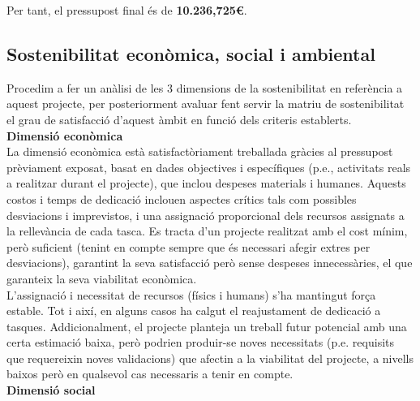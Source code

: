 Per tant, el pressupost final és de \textbf{10.236,725\euro}.

\subsection{Sostenibilitat econòmica, social i ambiental}

Procedim a fer un anàlisi de les 3 dimensions de la sostenibilitat en referència a aquest projecte, per posteriorment avaluar fent servir la matriu de sostenibilitat el grau de satisfacció d’aquest àmbit en funció dels criteris establerts.\\

\noindent \textbf{\large Dimensió econòmica}\\

\noindent La dimensió econòmica està satisfactòriament treballada gràcies al pressupost prèviament exposat, basat en dades objectives i específiques (p.e., activitats reals a realitzar durant el projecte), que inclou despeses materials i humanes. Aquests costos i temps de dedicació inclouen aspectes crítics tals com possibles desviacions i imprevistos, i una assignació proporcional dels recursos assignats a la rellevància de cada tasca. Es tracta d’un projecte realitzat amb el cost mínim, però suficient (tenint en compte sempre que és necessari afegir extres per desviacions), garantint la seva satisfacció però sense despeses innecessàries, el que garanteix la seva viabilitat econòmica.\\

L'assignació i necessitat de recursos (físics i humans) s'ha mantingut força estable. Tot i així, en alguns casos ha calgut el reajustament de dedicació a tasques. Addicionalment, el projecte planteja un treball futur potencial amb una certa estimació baixa, però podrien produir-se noves necessitats (p.e. requisits que requereixin noves validacions) que afectin a la viabilitat del projecte, a nivells baixos però en qualsevol cas necessaris a tenir en compte.\\

\noindent \textbf{\large Dimensió social}\\

